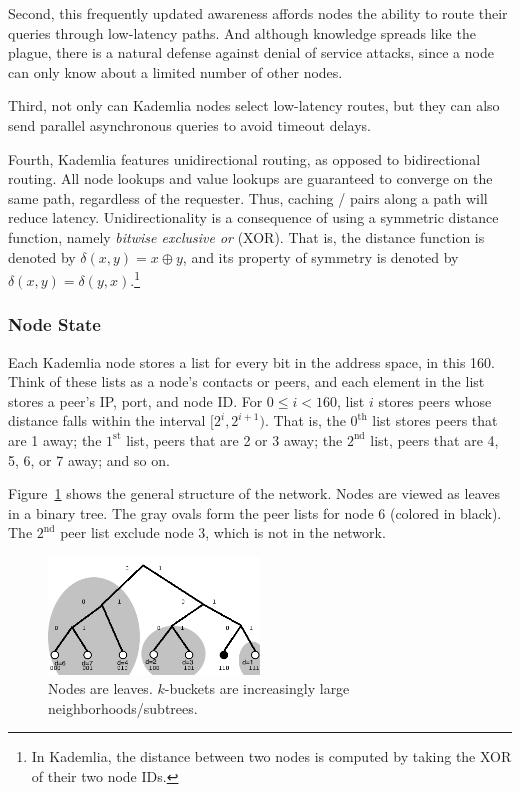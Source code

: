\documentclass[12pt,twocolumn]{article}
\begin{document}
Second, this frequently updated awareness affords nodes the ability to route their queries through low-latency paths.
And although knowledge spreads like the plague, there is a natural defense against denial of service attacks, since a node can only know about a limited number of other nodes.

Third, not only can Kademlia nodes select low-latency routes, but they can also send parallel asynchronous queries to avoid timeout delays.

Fourth, Kademlia features unidirectional routing, as opposed to bidirectional routing.
All node lookups and value lookups are guaranteed to converge on the same path, regardless of the requester.
Thus, caching \kv/ pairs along a path will reduce latency.
Unidirectionality is a consequence of using a symmetric distance function, namely \emph{bitwise exclusive or} (XOR).
That is, the distance function is denoted by $\delta(x,y) = x \oplus y$, and its property of symmetry is denoted by $\delta(x,y) = \delta(y,x)$.\footnote{In Kademlia, the distance between two nodes is computed by taking the XOR of their two node IDs.}

\subsubsection{Node State}
Each Kademlia node stores a list for every bit in the address space, in this 160.
Think of these lists as a node's contacts or peers, and each element in the list stores a peer's IP, port, and node ID.
For $0 \leq i < 160$, list $i$ stores peers whose distance falls within the interval $[2^i, 2^{i+1})$.
That is, the $0^{\mathrm{th}}$ list stores peers that are 1 away; the $1^{\mathrm{st}}$ list, peers that are 2 or 3 away; the $2^{\mathrm{nd}}$ list, peers that are 4, 5, 6, or 7 away; and so on.

Figure~\ref{tree} shows the general structure of the network. Nodes are viewed as leaves in a binary tree. The gray ovals form the peer lists for node 6 (colored in black). The $2^{\mathrm{nd}}$ peer list exclude node 3, which is not in the network.

\begin{figure}[h!]
  \centering
  \includegraphics[width=0.5\textwidth]{images/tree}
  \caption{\label{tree}Nodes are leaves. $k$-buckets are increasingly large neighborhoods/subtrees.}
\end{figure}
\end{document}
